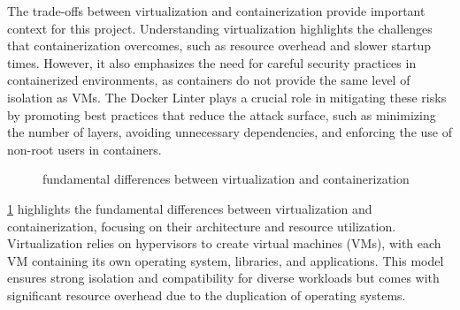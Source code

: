 The trade-offs between virtualization and containerization provide important context for this project. Understanding virtualization highlights the challenges that containerization overcomes, such as resource overhead and slower startup times. However, it also emphasizes the need for careful security practices in containerized environments, as containers do not provide the same level of isolation as VMs. The Docker Linter plays a crucial role in mitigating these risks by promoting best practices that reduce the attack surface, such as minimizing the number of layers, avoiding unnecessary dependencies, and enforcing the use of non-root users in containers.

\begin{figure}[ht]
  \centering
  \caption{fundamental differences between virtualization and containerization \cite{2022containerization}} %
  \label{fig:2.4} %
\end{figure}

\ref{fig:2.4} highlights the fundamental differences between virtualization and containerization, focusing on their architecture and resource utilization. Virtualization relies on hypervisors to create virtual machines (VMs), with each VM containing its own operating system, libraries, and applications. This model ensures strong isolation and compatibility for diverse workloads but comes with significant resource overhead due to the duplication of operating systems.

